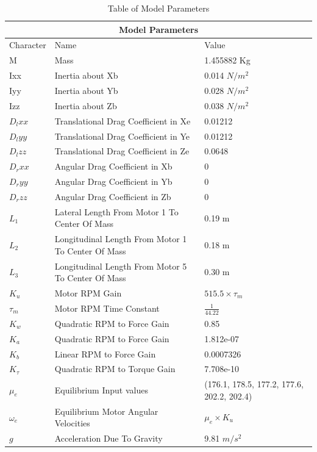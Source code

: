 \documentclass[12pt,a4paper,twoside]{report}
\begin{document}
			\begin{table}[h!]
			\centering
			\begin{tabular}{ |p{1.5cm}||p{9.5cm}|p{5cm}|  }
				\hline
				\multicolumn{3}{|c|}{Model Parameters} \\
				\hline
				Character& Name  & Value  \\
				\hline
				M        &  Mass                                                 & 1.455882 Kg\\
				Ixx      &  Inertia about Xb                                     & 0.014 $N/m^2$\\
				Iyy      &  Inertia about Yb                                     & 0.028 $N/m^2$\\
				Izz      &  Inertia about Zb                                     & 0.038 $N/m^2$\\
				$D_lxx$  &  Translational Drag Coefficient in Xe                 & 0.01212\\
				$D_lyy$  &  Translational Drag Coefficient in Ye                 & 0.01212\\
				$D_lzz$  &  Translational Drag Coefficient in Ze                 & 0.0648\\
				$D_rxx$  &  Angular Drag Coefficient in Xb                       & 0\\
				$D_ryy$  &  Angular Drag Coefficient in Yb                       & 0\\
				$D_rzz$  &  Angular Drag Coefficient in Zb                       & 0\\
				$L_1$    &  Lateral Length From Motor 1 To Center Of Mass        & 0.19 m\\
				$L_2$    &  Longitudinal Length From Motor 1 To Center Of Mass   & 0.18 m\\
				$L_3$    &  Longitudinal Length From Motor 5 To Center Of Mass   & 0.30 m\\
				$K_u$    &  Motor RPM Gain                                       & $515.5 \times \tau_m$\\
				$\tau_m$ &  Motor RPM Time Constant                              & $\frac{1}{44.22}$\\
				$K_w$    &  Quadratic RPM to Force Gain                          & 0.85\\
				$K_a$    &  Quadratic RPM to Force Gain                          & 1.812e-07\\
				$K_b$    &  Linear RPM to Force Gain                             & 0.0007326\\
				$K_\tau$ &  Quadratic RPM to Torque Gain                         & 7.708e-10\\
				$\mu_e$  &  Equilibrium Input values                         	 & (176.1, 178.5, 177.2, 177.6, 202.2, 202.4)\\
				$\omega_e$& Equilibrium Motor Angular Velocities                 & $\mu_e \times K_u $\\
				$g$      & Acceleration Due To Gravity                           & 9.81 $m/s^2$\\
				
				\hline
			\end{tabular}
			\caption{Table of Model Parameters}
			\label{table:modelparameters}
			\end{table}
			
\end{document}
